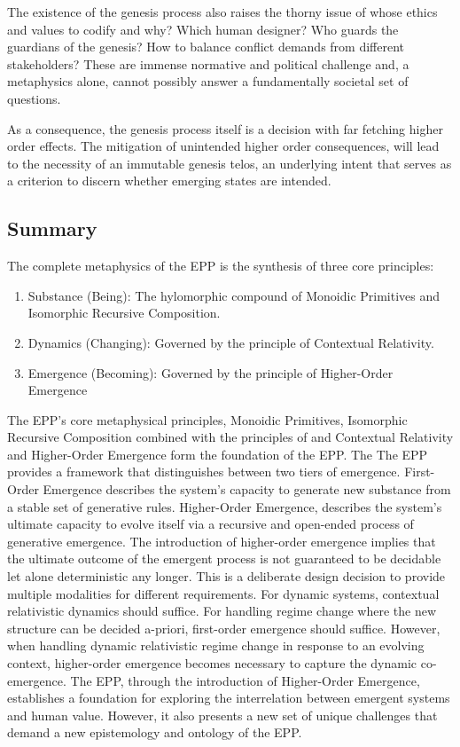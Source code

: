 The existence of the genesis process also raises the thorny issue of whose ethics and values to codify and why? Which human designer? Who guards the guardians of the genesis? How to balance conflict demands from different stakeholders? These are  immense normative and political challenge and, a metaphysics alone, cannot possibly answer a fundamentally societal set of questions. 

As a consequence, the genesis process itself is a decision with far fetching higher order effects. The mitigation of unintended higher order consequences, will lead to the necessity of an immutable genesis telos, an underlying intent that serves as a criterion to discern whether emerging states are intended. 

\subsection{Summary} 
\label{sec:metaphysics_summary}

The complete metaphysics of the EPP is the synthesis of three core principles:

\begin{enumerate}
\item Substance (Being): The hylomorphic compound of Monoidic Primitives and Isomorphic Recursive Composition.
\item Dynamics (Changing): Governed by the principle of Contextual Relativity.
\item Emergence (Becoming): Governed by the principle of Higher-Order Emergence 
\end{enumerate}


The EPP's core metaphysical principles, Monoidic Primitives, Isomorphic Recursive Composition combined with the principles of and Contextual Relativity and  Higher-Order Emergence form the foundation of the EPP. The The EPP provides a framework that distinguishes between two tiers of emergence. First-Order Emergence describes the system's capacity to generate new  substance from a stable set of generative rules. Higher-Order Emergence, describes the system's ultimate capacity to evolve itself via a recursive and open-ended process of generative emergence. The introduction of higher-order emergence implies that the ultimate outcome of the emergent process is not guaranteed to be decidable let alone deterministic any longer. This is a deliberate design decision to provide multiple modalities for different requirements. For dynamic systems, contextual relativistic dynamics should suffice. For handling regime change where the new structure can be decided a-priori, first-order emergence should suffice. However, when handling dynamic relativistic regime change in response to an evolving context, higher-order emergence becomes necessary to capture the dynamic co-emergence. The EPP, through the introduction of Higher-Order Emergence, establishes a foundation for exploring the interrelation between emergent systems and human value. However, it also presents a new set of unique challenges that demand a new epistemology and ontology of the EPP. 

\newpage